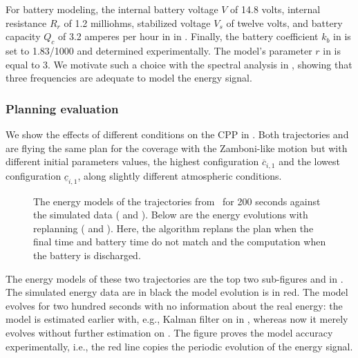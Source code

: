 For battery modeling, the internal battery voltage $V$ of 14.8 volts, internal resistance $R_r$ of 1.2 milliohms, stabilized voltage $V_s$ of twelve volts, and battery capacity $Q_c$ of 3.2 amperes per hour in  in . Finally, the battery coefficient $k_b$ in  is set to 1.83/1000 and determined experimentally. The model's parameter $r$ in  is equal to 3. We motivate such a choice with the spectral analysis in , showing that three frequencies are adequate to model the energy signal.

\subsubsection*{Planning evaluation}

We show the effects of different conditions on the CPP in . Both trajectories  and  are flying the same plan for the coverage with the Zamboni-like motion but with different initial parameters values, the highest configuration $\overline{c}_{i,1}$ and the lowest configuration $\underline{c}_{i,1}$, along slightly different atmospheric conditions. 
\begin{figure}[h!]
  \centering
  \selectfont
  \footnotesize    
  
  \caption[Numerical simulations with the energy models of different static and dynamic plans]{The energy models of the trajectories from~ for 200 seconds against the simulated data ( and ). Below are the energy evolutions with replanning ( and ). Here, the algorithm replans the plan when the final time and battery time do not match and the computation when the battery is discharged.}
  \label{fig:ener-revised}
\end{figure}
The energy models of these two trajectories are the top two sub-figures  and  in . The simulated energy data are in black the model evolution is in red. The model evolves for two hundred seconds with no information about the real energy: the model is estimated earlier with, e.g., Kalman filter on  in , whereas now it merely evolves without further estimation on . The figure proves the model accuracy experimentally, i.e., the red line copies the periodic evolution of the energy signal.

